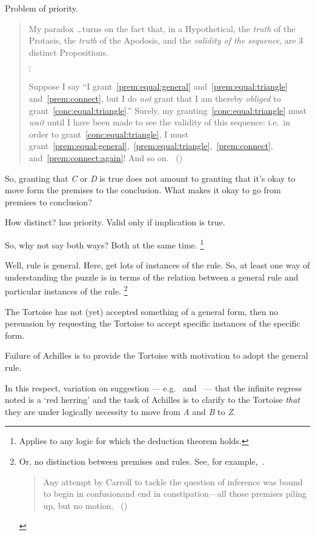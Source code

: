 \begin{note}
  Problem of priority.
  \begin{quote}
    My paradox \dots turns on the fact that, in a Hypothetical, the \emph{truth} of the Protasis, the \emph{truth} of the Apodosis, and the \emph{validity of the sequence}, are 3 distinct Propositions.

    \mbox{}\hfill\(\vdots\)\hfill\mbox{}

    Suppose I say ``I grant~\ref{prem:equal:general} and~\ref{prem:equal:triangle} and~\ref{prem:connect}, but I do \emph{not} grant that I am thereby \emph{obliged} to grant~\ref{conc:equal:triangle}.''
    Surely, my granting~\ref{conc:equal:triangle} must \emph{wait} until I have been made to see the validity of this sequence: i.e.\ in order to grant~\ref{conc:equal:triangle}, I must grant~\ref{prem:equal:general},~\ref{prem:equal:triangle},~\ref{prem:connect}, and~\ref{prem:connect:again}! And so on.%
    \mbox{ }\hfill\mbox{(\citeyear[472]{Carroll:1977wl})}
  \end{quote}

  So, granting that \emph{C} or \emph{D} is true does not amount to granting that it's okay to move form the premises to the conclusion.
  What makes it okay to go from premises to conclusion?

  How distinct?
  \citeauthor{Carroll:1977wl} has priority.
  Valid only if implication is true.

  So, why not say both ways?
  Both at the same time.%
  \footnote{
    Applies to any logic for which the deduction theorem holds.
  }

  Well, rule is general.
  Here, get lots of instances of the rule.
  So, at least one way of understanding the puzzle is in terms of the relation between a general rule and particular instances of the rule.%
  \footnote{
    Or, no distinction between premises and rules.
    See, for example,~\textcite{Smiley:1995wk}.
    \begin{quote}
      Any attempt by Carroll to tackle the question of inference was bound to begin in confusionand end in constipation---all those premises piling up, but no motion.\newline
      \mbox{ }\hfill\mbox{(\citeyear[727]{Smiley:1995wk})}
    \end{quote}
  }

  The Tortoise has not (yet) accepted something of a general form, then no persuasion by requesting the Tortoise to accept specific instances of the specific form.

  Failure of Achilles is to provide the Tortoise with motivation to adopt the general rule.

  In this respect, variation on suggestion --- e.g.\ \textcite[21--22,33]{Thomson:2010tt} and~\textcite[573]{Wisdom:1974uc} ---  that the infinite regress \citeauthor{Carroll:1895uj} noted is a `red herring' and the task of Achilles is to clarify to the Tortoise \emph{that} they are under logically necessity to move from \emph{A} and \emph{B} to \emph{Z}.
\end{note}

